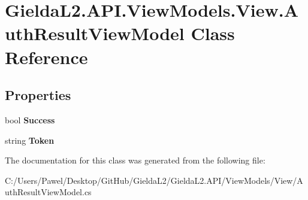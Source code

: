 \hypertarget{class_gielda_l2_1_1_a_p_i_1_1_view_models_1_1_view_1_1_auth_result_view_model}{}\section{Gielda\+L2.\+A\+P\+I.\+View\+Models.\+View.\+Auth\+Result\+View\+Model Class Reference}
\label{class_gielda_l2_1_1_a_p_i_1_1_view_models_1_1_view_1_1_auth_result_view_model}
\subsection*{Properties}
\begin{DoxyCompactItemize}
\item 
\mbox{\label{class_gielda_l2_1_1_a_p_i_1_1_view_models_1_1_view_1_1_auth_result_view_model_a68049f17284f2a8dbe1642707f494f15}} 
bool {\bfseries Success}
\item 
\mbox{\label{class_gielda_l2_1_1_a_p_i_1_1_view_models_1_1_view_1_1_auth_result_view_model_a49b069a1fbaa0fb7b25ea43e8db1a1a9}} 
string {\bfseries Token}
\end{DoxyCompactItemize}


The documentation for this class was generated from the following file\+:\begin{DoxyCompactItemize}
\item 
C\+:/\+Users/\+Pawel/\+Desktop/\+Git\+Hub/\+Gielda\+L2/\+Gielda\+L2.\+A\+P\+I/\+View\+Models/\+View/Auth\+Result\+View\+Model.\+cs\end{DoxyCompactItemize}

